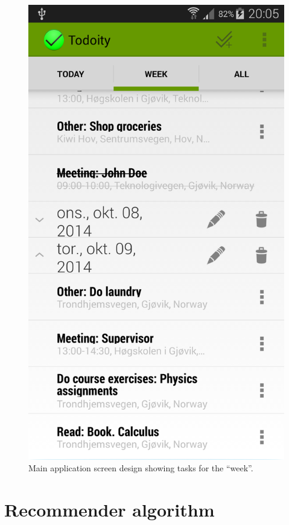 \begin{figure}[h]
\centering
\includegraphics[width=0.25\columnwidth]{appendix/MainScreenWeek.PNG}
\caption{Main application screen design showing tasks for the ``week''.}
\end{figure}



\chapter{Recommender algorithm}

